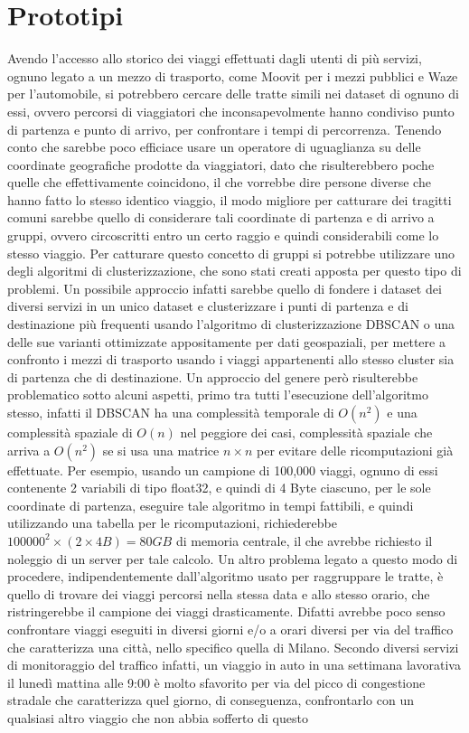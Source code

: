 \section{Prototipi}

Avendo l'accesso allo storico dei viaggi effettuati dagli utenti di più servizi, ognuno legato a un mezzo di trasporto, come Moovit per i mezzi pubblici e Waze per l'automobile, si potrebbero cercare delle tratte simili nei dataset di ognuno di essi, ovvero percorsi di viaggiatori che inconsapevolmente hanno condiviso punto di partenza e punto di arrivo, per confrontare i tempi di percorrenza. Tenendo conto che sarebbe poco efficiace usare un operatore di uguaglianza su delle coordinate geografiche prodotte da viaggiatori, dato che risulterebbero poche quelle che effettivamente coincidono, il che vorrebbe dire persone diverse che hanno fatto lo stesso identico viaggio, il modo migliore per catturare dei tragitti comuni sarebbe quello di considerare tali coordinate di partenza e di arrivo a gruppi, ovvero circoscritti entro un certo raggio e quindi considerabili come lo stesso viaggio. Per catturare questo concetto di gruppi si potrebbe utilizzare uno degli algoritmi di clusterizzazione, che sono stati creati apposta per questo tipo di problemi. Un possibile approccio infatti sarebbe quello di fondere i dataset dei diversi servizi in un unico dataset e clusterizzare i punti di partenza e di destinazione più frequenti usando l'algoritmo di clusterizzazione DBSCAN\cite{ester1996} o una delle sue varianti ottimizzate appositamente per dati geospaziali\cite{zhou2003}\cite{borah2004}, per mettere a confronto i mezzi di trasporto usando i viaggi appartenenti allo stesso cluster sia di partenza che di destinazione. Un approccio del genere però risulterebbe problematico sotto alcuni aspetti, primo tra tutti l'esecuzione dell'algoritmo stesso, infatti il DBSCAN ha una complessità temporale di $O(n^{2})$ e una complessità spaziale di $O(n)$ nel peggiore dei casi, complessità spaziale che arriva a $O(n^2)$ se si usa una matrice $n \times n$ per evitare delle ricomputazioni già effettuate. Per esempio, usando un campione di 100,000 viaggi, ognuno di essi contenente 2 variabili di tipo float32, e quindi di 4 Byte ciascuno, per le sole coordinate di partenza, eseguire tale algoritmo in tempi fattibili, e quindi utilizzando una tabella per le ricomputazioni, richiederebbe $100000^{2} \times (2 \times 4 B) = 80 GB$ di memoria centrale, il che avrebbe richiesto il noleggio di un server per tale calcolo. Un altro problema legato a questo modo di procedere, indipendentemente dall'algoritmo usato per raggruppare le tratte, è quello di trovare dei viaggi percorsi nella stessa data e allo stesso orario, che ristringerebbe il campione dei viaggi drasticamente. Difatti avrebbe poco senso confrontare viaggi eseguiti in diversi giorni e/o a orari diversi per via del traffico che caratterizza una città, nello specifico quella di Milano. Secondo diversi servizi di monitoraggio del traffico infatti, un viaggio in auto in una settimana lavorativa il lunedì mattina alle 9:00 è molto sfavorito per via del picco di congestione stradale che caratterizza quel giorno, di conseguenza, confrontarlo con un qualsiasi altro viaggio che non abbia sofferto di questo 